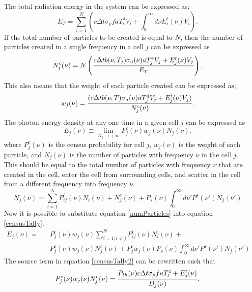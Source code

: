 	The total radiation energy in the system can be expressed as;
	\begin{equation}
	\label{totalEnergy}
	E_T=\sum\limits_{i=1}^N\left(c\Delta{t}\sigma_pfaT_i^4V_i+\int^\infty_0d\nu E_i^t(\nu)V_i\right).
	\end{equation}
	If the total number of particles to be created is equal to $N$, then the number of particles created in a single frequency in a cell $j$ can be expressed as
	\begin{equation}
	\label{censusTally}
	N^c_j(\nu)=N\left({c\Delta{t}b(\nu,T_j)\sigma_a(\nu) aT_j^4V_j+E_j^t(\nu)V_j\over{E_T}}\right).
	\end{equation}
	This also means that the weight of each particle created can be expressed as;
	\begin{equation}
	\label{particleWeight}
	w_j(\nu)={(c\Delta{t}b(\nu,T)\sigma_a(\nu) aT_j^4V_j+E_j^t(\nu)V_j)\over{N^c_j(\nu)}}.
	\end{equation}
	The photon energy density at any one time in a given cell $j$ can be expressed as
	\begin{equation}
	\label{censusTally}
	E_j(\nu)\equiv\lim_{N_j \to +\infty}P^c_j(\nu)w_j(\nu)N_j(\nu).
	\end{equation}
	where $ P^c_j(\nu) $ is the census probability for cell $j$, $w_j(\nu)$ is the weight of each particle, and $N_j(\nu)$ is the number of particles with frequency $\nu$ in the cell $j$. This should be equal to the total number of particles with frequency $\nu$ that are created in the cell, enter the cell from surrounding cells, and scatter in the cell from a different frequency into frequency $\nu$.
	\begin{equation}
	\label{numParticles} 
	N_j(\nu)=\sum_{i=1}^N{P^l_{ij}(\nu)}N_i(\nu)+N^c_j(\nu)+P_s(\nu)\int^\infty_0d\nu' P^s(\nu')N_j(\nu')
	\end{equation}
	Now it is possible to substitute equation \ref{numParticles} into equation \ref{censusTally}.
	\begin{eqnarray}
	\label{censusTally2}
	E_j(\nu)=& &P^c_j(\nu)w_j(\nu)\sum_{i=1;i\neq{j}}^N{P^l_{ij}(\nu)}N_i(\nu)+\\& & \nonumber
		P^c_j(\nu)w_j(\nu)N^c_j(\nu)+P^c_jw_j(\nu)P_s(\nu)\int^\infty_0d\nu' P^s(\nu')N_j(\nu')
	\end{eqnarray}
	The source term in equation \ref{censusTally2} can be rewritten such that
	\begin{equation}
	\label{censusSourceTerm}
	P^c_j(\nu)w_j(\nu)N^c_j(\nu)={P_{th}(\nu)c\Delta{t}\sigma_pfaT_t^4+E_j^t(\nu)\over{D_j(\nu)}}.
	\end{equation}

